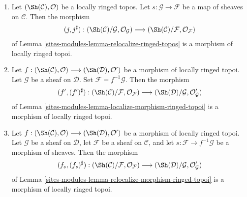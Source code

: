 \begin{lemma}
\begin{enumerate}
$$(\Sh(\mathcal{C})/\mathcal{F}, \mathcal{O}_\mathcal{F})
\to
(\Sh(\mathcal{C}), \mathcal{O})
$$
is a morphism of locally ringed topoi.
\item  Let $(\Sh(\mathcal{C}), \mathcal{O})$ be a locally
ringed topos. Let $s : \mathcal{G} \to \mathcal{F}$ be a map of sheaves
on $\mathcal{C}$. Then the morphism
$$
(j, j^\sharp) :
(\Sh(\mathcal{C})/\mathcal{G}, \mathcal{O}_\mathcal{G})
\longrightarrow
(\Sh(\mathcal{C})/\mathcal{F}, \mathcal{O}_\mathcal{F})
$$
of
Lemma \ref{sites-modules-lemma-relocalize-ringed-topos}
is a morphism of locally ringed topoi.
\item Let
$f :
(\Sh(\mathcal{C}), \mathcal{O})
\longrightarrow
(\Sh(\mathcal{D}), \mathcal{O}')$
be a morphism of locally ringed topoi. Let $\mathcal{G}$ be a sheaf
on $\mathcal{D}$. Set $\mathcal{F} = f^{-1}\mathcal{G}$.
Then the morphism
$$
(f', (f')^\sharp) :
(\Sh(\mathcal{C})/\mathcal{F}, \mathcal{O}_\mathcal{F})
\longrightarrow
(\Sh(\mathcal{D})/\mathcal{G}, \mathcal{O}'_\mathcal{G})
$$
of
Lemma \ref{sites-modules-lemma-localize-morphism-ringed-topoi}
is a morphism of locally ringed topoi.
\item  Let
$f :
(\Sh(\mathcal{C}), \mathcal{O})
\longrightarrow
(\Sh(\mathcal{D}), \mathcal{O}')$
be a morphism of locally ringed topoi. Let $\mathcal{G}$ be a sheaf
on $\mathcal{D}$, let $\mathcal{F}$ be a sheaf on $\mathcal{C}$, and
let $s : \mathcal{F} \to f^{-1}\mathcal{G}$ be a morphism of sheaves.
Then the morphism
$$
(f_s, (f_s)^\sharp) :
(\Sh(\mathcal{C})/\mathcal{F}, \mathcal{O}_\mathcal{F})
\longrightarrow
(\Sh(\mathcal{D})/\mathcal{G}, \mathcal{O}'_\mathcal{G})
$$
of
Lemma \ref{sites-modules-lemma-relocalize-morphism-ringed-topoi}
is a morphism of locally ringed topoi.
\end{enumerate}
\end{lemma}

